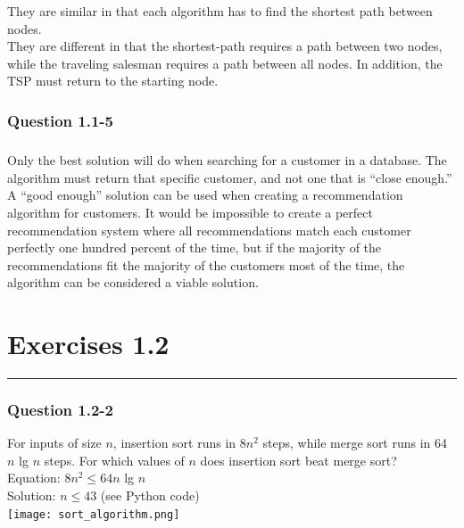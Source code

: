 \documentclass[10pt]{article}
\begin{document}
They are similar in that each algorithm has to find the shortest path between nodes.\\

They are different in that the shortest-path requires a path between two nodes, while the traveling salesman requires a path between all nodes. In addition, the TSP must return to the starting node.\\

\subsubsection*{Question 1.1-5}
\subparagraph{} 
 Only the best solution will do when searching for a customer in a database. The algorithm must return that specific customer, and not one that is ``close enough.''\\

A ``good enough'' solution can be used when creating a recommendation algorithm for customers. It would be impossible to create a perfect recommendation system where all recommendations match each customer perfectly one hundred percent of the time, but if the majority of the recommendations fit the majority of the customers most of the time, the algorithm can be considered a viable solution.\\

\section*{Exercises 1.2}\nointerlineskip
\noindent \rule{\linewidth}{0.01pt}
\subsubsection*{Question 1.2-2}
For inputs of size $n$, insertion sort runs in $8n^2$ steps, while merge sort runs in 64 $n$ lg $n$ steps. For which values of $n$ does insertion sort beat merge sort?\\ 

Equation: 8$n^2 \leq 64 n $ lg $n$\\
\indent Solution: $n\leq43$ (see Python code) \\

\texttt{[image: sort\_algorithm.png]}\\
\end{document}
